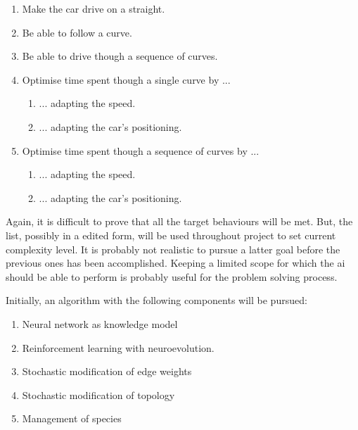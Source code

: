 
\begin{enumerate}
  \item Make the car drive on a straight.
  \item Be able to follow a curve.
  \item Be able to drive though a sequence of curves.
  \item Optimise time spent though a single curve by ...
    \begin{enumerate}
        \item ... adapting the speed.
        \item ... adapting the car's positioning.
    \end{enumerate}
  \item Optimise time spent though a sequence of curves by ...
    \begin{enumerate}
        \item ... adapting the speed.
        \item ... adapting the car's positioning.
    \end{enumerate}
\end{enumerate}

Again, it is difficult to prove that all the target behaviours will be met. But, the list, possibly in a edited form, will be used throughout project to set current complexity level. It is probably not realistic to pursue a latter goal before the previous ones has been accomplished. Keeping a limited scope for which the ai should be able to perform is probably useful for the problem solving process.


Initially, an algorithm with the following components will be pursued:
\begin{enumerate} 
    \item Neural network as knowledge model
    \item Reinforcement learning with neuroevolution.
    \item Stochastic modification of edge weights
    \item Stochastic modification of topology
    \item Management of species
\end{enumerate}

